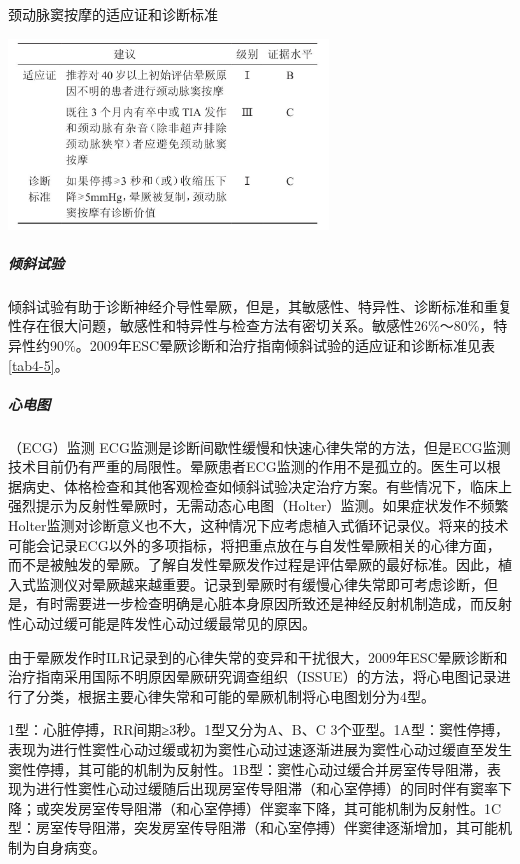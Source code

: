 \begin{table}[htbp]
\centering
\caption{颈动脉窦按摩的适应证和诊断标准}
\label{tab4-4}
\includegraphics[width=3.34375in,height=1.98958in]{./images/Image00021.jpg}
\end{table}

\subparagraph{倾斜试验}

倾斜试验有助于诊断神经介导性晕厥，但是，其敏感性、特异性、诊断标准和重复性存在很大问题，敏感性和特异性与检查方法有密切关系。敏感性26\%～80\%，特异性约90\%。2009年ESC晕厥诊断和治疗指南倾斜试验的适应证和诊断标准见表\ref{tab4-5}。

\subparagraph{心电图}

（ECG）监测
ECG监测是诊断间歇性缓慢和快速心律失常的方法，但是ECG监测技术目前仍有严重的局限性。晕厥患者ECG监测的作用不是孤立的。医生可以根据病史、体格检查和其他客观检查如倾斜试验决定治疗方案。有些情况下，临床上强烈提示为反射性晕厥时，无需动态心电图（Holter）监测。如果症状发作不频繁Holter监测对诊断意义也不大，这种情况下应考虑植入式循环记录仪。将来的技术可能会记录ECG以外的多项指标，将把重点放在与自发性晕厥相关的心律方面，而不是被触发的晕厥。了解自发性晕厥发作过程是评估晕厥的最好标准。因此，植入式监测仪对晕厥越来越重要。记录到晕厥时有缓慢心律失常即可考虑诊断，但是，有时需要进一步检查明确是心脏本身原因所致还是神经反射机制造成，而反射性心动过缓可能是阵发性心动过缓最常见的原因。

由于晕厥发作时ILR记录到的心律失常的变异和干扰很大，2009年ESC晕厥诊断和治疗指南采用国际不明原因晕厥研究调查组织（ISSUE）的方法，将心电图记录进行了分类，根据主要心律失常和可能的晕厥机制将心电图划分为4型。

1型：心脏停搏，RR间期≥3秒。1型又分为A、B、C
3个亚型。1A型：窦性停搏，表现为进行性窦性心动过缓或初为窦性心动过速逐渐进展为窦性心动过缓直至发生窦性停搏，其可能的机制为反射性。1B型：窦性心动过缓合并房室传导阻滞，表现为进行性窦性心动过缓随后出现房室传导阻滞（和心室停搏）的同时伴有窦率下降；或突发房室传导阻滞（和心室停搏）伴窦率下降，其可能机制为反射性。1C型：房室传导阻滞，突发房室传导阻滞（和心室停搏）伴窦律逐渐增加，其可能机制为自身病变。

